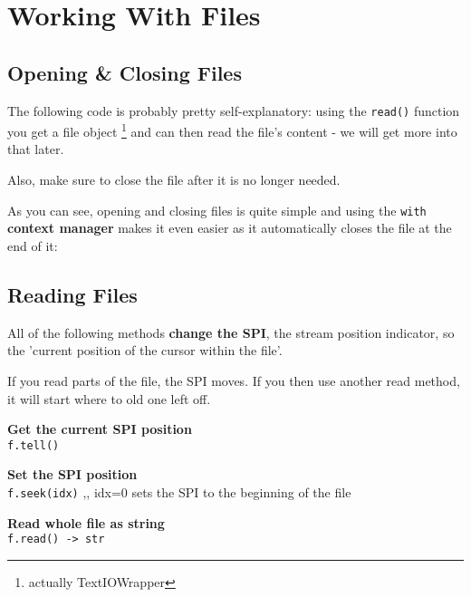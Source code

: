 \section{Working With Files}

    \subsection{Opening \& Closing Files}
        The following code is probably pretty self-explanatory:
        using the \texttt{read()} function you get a file object
        \footnote{actually TextIOWrapper} and can then read the file's content
        - we will get more into that later.

        Also, make sure to close the file after it is no longer needed.


        As you can see, opening and closing files is quite simple and using the
        \texttt{with} \textbf{context manager} makes it even easier as it automatically
        closes the file at the end of it:


    \subsection{Reading Files}

        All of the following methods \textbf{change the SPI}, the stream position indicator, so the
        'current position of the cursor within the file'.

        If you read parts of the file, the SPI moves. If you then use another read method, it will
        start where to old one left off.

        \textbf{Get the current SPI position} \\
        \texttt{f.tell()}

        \textbf{Set the SPI position} \\
        \texttt{f.seek(idx)} \sep{,}
        idx=0 sets the SPI to the beginning of the file

        \textbf{Read whole file as string} \\
        \texttt{f.read() -> str}

